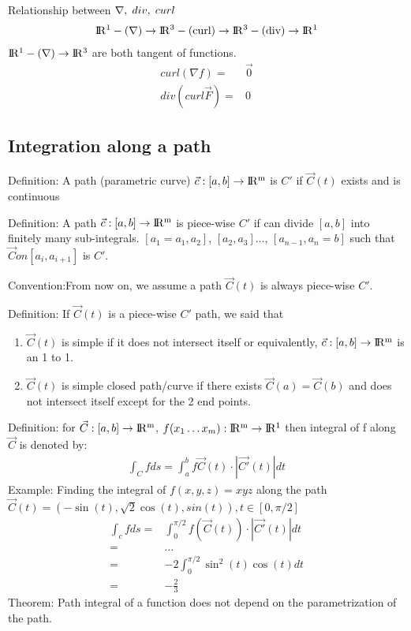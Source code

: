 \documentclass{article}
\newcommand{\R}{\rm I\!R}
\begin{document}
        Relationship between $\nabla,\;div,\;curl\\$
        \begin{align}
            \R^1 -(\nabla)\rightarrow \R^3 -(curl)\rightarrow \R^3 -(div)\rightarrow \R^1
        \end{align}
        $\R^1 -(\nabla)\rightarrow \R^3$ are both tangent of functions.
        \begin{align}
            curl(\nabla f) =& \vec{0}\\
            div(curl \vec{F}) =& 0
        \end{align}
        
    \subsection{Integration along a path}
    
        Definition: A path (parametric curve) $\vec{c}:[a,b]\rightarrow \R^m$ is $C'$ if $\vec{C}(t)$ exists and is continuous
        
        Definition: A path $\vec{c}:[a,b]\rightarrow \R^m$ is piece-wise $C'$ if can divide $[a,b]$ into finitely many sub-integrals. $[a_1 = a_1, a_2]$, $[a_2, a_3]\dots$, $[a_{n-1}, a_n = b]$ such that $\vec{C} on [a_i,a_{i+1}]$ is $C'$.
        
        Convention:From now on, we assume a path $\vec{C}(t)$ is always piece-wise $C'$.
        
        Definition: If $\vec{C}(t)$ is a piece-wise $C'$ path, we said that
        \begin{enumerate}
            \item $\vec{C}(t)$ is simple if it does not intersect itself or equivalently, $\vec{c}:[a,b]\rightarrow \R^m$ is an 1 to 1.
            \item $\vec{C}(t)$ is simple closed path/curve if there exists $\vec{C}(a) = \vec{C}(b)$ and does not intersect itself except for the 2 end points. 
        \end{enumerate}
        
        Definition: for $\vec{C}:[a,b]\rightarrow \R^m$, $f(x_1\dots x_m): \R^m \rightarrow \R^1$ then integral of f along $\vec{C}$ is denoted by:
        \begin{align}
            \int_{C}f ds=\int_{a}^{b}f\vec{C}(t)\cdot|\vec{C'}(t)|dt
        \end{align}
        Example: Finding the integral of $f(x,y,z) = xyz$ along the path $\vec{C}(t)=(-\sin(t),\sqrt{2}\cos(t),sin(t)), t\in[0,\pi/2]$
        \begin{align}
            \int_c fds =& \int_{0}^{\pi/2}f(\vec{C}(t))\cdot|\vec{C'}(t)|dt\\
            =&\dots\\
            =&-2\int_{0}^{\pi/2} \sin^2(t)\cos(t)dt\\
            =&-\frac{2}{3}
        \end{align}
        Theorem: Path integral of a function does not depend on the parametrization of the path.
        
\end{document}
